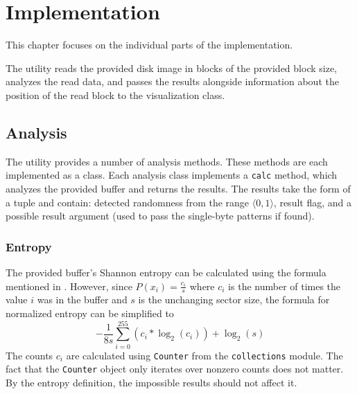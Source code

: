 \documentclass[
  digital, %
  oneside, %
  lof,     %
  lot,     %
]{fithesis4}
\begin{document}
\chapter{Implementation}
This chapter focuses on the individual parts of the implementation.

The utility reads the provided disk image in blocks of the provided block size, analyzes the read data, and passes the results alongside information about the position of the read block to the visualization class.

\section{Analysis}
The utility provides a number of analysis methods.
These methods are each implemented as a class.
Each analysis class implements a \texttt{calc} method, which analyzes the provided buffer and returns the results.
The results take the form of a tuple and contain: detected randomness from the range $\langle0,1\rangle$, result flag, and a possible result argument (used to pass the single-byte patterns if found).

\subsection{Entropy}

The provided buffer's Shannon entropy can be calculated using the formula mentioned in \textbf{}.
However, since $P(x_i) = \frac{c_i}{s}$ where $c_i$ is the number of times the value $i$ was in the buffer and $s$ is the unchanging sector size, the formula for normalized entropy can be simplified to
$$-\frac{1}{8s}\sum_{i=0}^{255}(c_i * \log_2(c_i)) + \log_2(s)$$
The counts $c_i$ are calculated using \texttt{Counter} from the \texttt{collections} module\cite{collections}.
The fact that the \texttt{Counter} object only iterates over nonzero counts does not matter.
By the entropy definition, the impossible results should not affect it.
\end{document}
